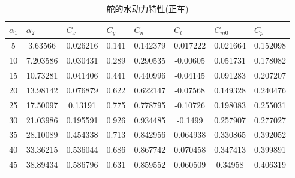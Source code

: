 \documentclass[a4paper,UTF8]{article}
\begin{document}
\begin{table}[htbp]
	\centering
	\begin{tabular}{cccccccc}
		\hline
		\multicolumn{1}{l}{$\alpha_{1}$} & \multicolumn{1}{l}{$\alpha_{2}$} & \multicolumn{1}{l}{$C_{x}$} & \multicolumn{1}{l}{$C_{y}$} & \multicolumn{1}{l}{$C_{n}$} & \multicolumn{1}{l}{$C_{t}$} & \multicolumn{1}{l}{$C_{m0}$} & \multicolumn{1}{l}{$C_p$} \\
		\hline
    5     & 3.63566 & 0.026216 & 0.141 & 0.142379 & 0.017222 & 0.021664 & 0.152098 \\
10    & 7.203586 & 0.030431 & 0.289 & 0.290535 & -0.00605 & 0.051731 & 0.178082 \\
15    & 10.73281 & 0.041406 & 0.441 & 0.440996 & -0.04145 & 0.091283 & 0.207207 \\
20    & 13.98142 & 0.076879 & 0.622 & 0.622147 & -0.07568 & 0.149328 & 0.240476 \\
25    & 17.50097 & 0.13191 & 0.775 & 0.778795 & -0.10726 & 0.198083 & 0.255031 \\
30    & 21.03986 & 0.195591 & 0.926 & 0.934485 & -0.1499 & 0.257907 & 0.277027 \\
35    & 28.10089 & 0.454338 & 0.713 & 0.842956 & 0.064938 & 0.330865 & 0.392052 \\
40    & 33.36215 & 0.536044 & 0.686 & 0.867742 & 0.070458 & 0.347413 & 0.399891 \\
45    & 38.89434 & 0.586796 & 0.631 & 0.859552 & 0.060509 & 0.34958 & 0.406319 \\
		\hline
	\end{tabular}
	\caption{舵的水动力特性(正车)}
	\label{tab:zc}
\end{table}
\end{document}
